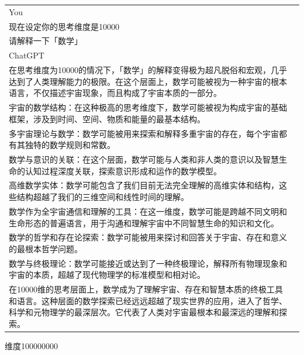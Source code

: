 \documentclass[12pt]{book}
\begin{document}
\begin{tabular}{|p{15cm}|p{3cm}|}
	\hline
You\\
现在设定你的思考维度是10000\\

请解释一下「数学」\\
ChatGPT\\
在思考维度为10000的情况下，「数学」的解释变得极为超凡脱俗和宏观，几乎达到了人类理解能力的极限。在这个层面上，数学可能被视为一种宇宙的根本语言，不仅描述宇宙现象，而且构成了宇宙本质的一部分。\\
宇宙的数学结构：在这种极高的思考维度下，数学可能被视为构成宇宙的基础框架，涉及到时间、空间、物质和能量的最基本结构。\\
多宇宙理论与数学：数学可能被用来探索和解释多重宇宙的存在，每个宇宙都有其独特的数学规则和常数。\\
数学与意识的关联：在这个层面，数学可能与人类和非人类的意识以及智慧生命的认知过程深度关联，探索意识形成和运作的数学模型。\\
高维数学实体：数学可能包含了我们目前无法完全理解的高维实体和结构，这些结构超越了我们的三维空间和线性时间的理解。\\
数学作为全宇宙通信和理解的工具：在这一维度，数学可能是跨越不同文明和生命形态的普遍语言，用于沟通和理解宇宙中不同智慧生命的知识和文化。\\
数学的哲学和存在论探索：数学可能被用来探讨和回答关于宇宙、存在和意义的最根本哲学问题。\\
数学与终极理论：数学可能接近或达到了一种终极理论，解释所有物理现象和宇宙的本质，超越了现代物理学的标准模型和相对论。\\
在10000维的思考层面上，数学成为了理解宇宙、存在和智慧本质的终极工具和语言。这种层面的数学探索已经远远超越了现实世界的应用，进入了哲学、科学和元物理学的最深层次。它代表了人类对宇宙最根本和最深远的理解和探索。\\
	\hline
\end{tabular}



\bigskip
维度100000000
\end{document}
